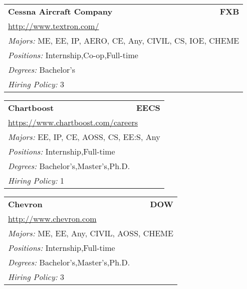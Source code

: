 \documentclass[twoside]{article}
\begin{document}
\begin{center}
\begin{multicols}{3}
\begin{FlushLeft}
\begin{minipage}{\columnwidth}
\end{minipage}
 
\begin{minipage}{\columnwidth}\begin{tabularx}{.95\columnwidth}{Xr}
                 {\Large\bf Cessna Aircraft Company} & {\Large\bf FXB}\\
    \multicolumn{2}{p{.95\columnwidth}}{\url{http://www.textron.com/}}\\
    \multicolumn{2}{p{.95\columnwidth}}{\emph{Majors:} ME, EE, IP, AERO, CE, Any, CIVIL, CS, IOE, CHEME}\\
    \multicolumn{2}{p{.95\columnwidth}}{\emph{Positions:} Internship,Co-op,Full-time}\\
    \multicolumn{2}{p{.95\columnwidth}}{\emph{Degrees:} Bachelor's}\\
    \multicolumn{2}{p{.95\columnwidth}}{\emph{Hiring Policy:} 3}\\
    \end{tabularx}
    
\end{minipage}
 
\begin{minipage}{\columnwidth}\begin{tabularx}{.95\columnwidth}{Xr}
                 {\Large\bf Chartboost} & {\Large\bf EECS}\\
    \multicolumn{2}{p{.95\columnwidth}}{\url{https://www.chartboost.com/careers}}\\
    \multicolumn{2}{p{.95\columnwidth}}{\emph{Majors:} EE, IP, CE, AOSS, CS, EE:S, Any}\\
    \multicolumn{2}{p{.95\columnwidth}}{\emph{Positions:} Internship,Full-time}\\
    \multicolumn{2}{p{.95\columnwidth}}{\emph{Degrees:} Bachelor's,Master's,Ph.D.}\\
    \multicolumn{2}{p{.95\columnwidth}}{\emph{Hiring Policy:} 1}\\
    \end{tabularx}
    
\end{minipage}
 
\begin{minipage}{\columnwidth}\begin{tabularx}{.95\columnwidth}{Xr}
                 {\Large\bf Chevron} & {\Large\bf DOW}\\
    \multicolumn{2}{p{.95\columnwidth}}{\url{http://www.chevron.com}}\\
    \multicolumn{2}{p{.95\columnwidth}}{\emph{Majors:} ME, EE, Any, CIVIL, AOSS, CHEME}\\
    \multicolumn{2}{p{.95\columnwidth}}{\emph{Positions:} Internship,Full-time}\\
    \multicolumn{2}{p{.95\columnwidth}}{\emph{Degrees:} Bachelor's,Master's,Ph.D.}\\
    \multicolumn{2}{p{.95\columnwidth}}{\emph{Hiring Policy:} 3}\\
    \end{tabularx}
    

\end{minipage}
\end{FlushLeft}
\end{multicols}
\end{center}
\end{document}
